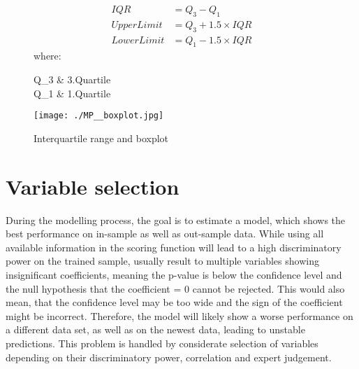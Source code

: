 \begin{figure}[H]
\begin{minipage}{.5\textwidth}
	\begin{align} 
	IQR &= Q_3 - Q_1 \label{eq:dp_iqr_boxpl1}\\
	Upper Limit &= Q_3 + 1.5 \times IQR \label{eq:dp_iqr_boxpl2}\\
	Lower Limit &= Q_1 - 1.5 \times IQR \label{eq:dp_iqr_boxpl3}
	\end{align}
	where:
	\begin{conditions}
	Q_{3}  		& 3.Quartile \\
	Q_{1}  		& 1.Quartile \\
	\end{conditions}
\end{minipage}%
\begin{minipage}{.5\textwidth}
	\centering
	\texttt{[image: ./MP\_\_boxplot.jpg]}
\end{minipage}
    \caption{Interquartile range and boxplot}
    \label{fig:dp_iqr_boxpl}
\end{figure}

\section{Variable selection}
During the modelling process, the goal is to estimate a model, which shows the best performance on in-sample as well as out-sample data. While using all available information in the scoring function will lead to a high discriminatory power on the trained sample, usually result to multiple variables showing insignificant coefficients, meaning the p-value is below the confidence level and the null hypothesis that the coefficient = 0 cannot be rejected. This would also mean, that the confidence level may be too wide and the sign of the coefficient might be incorrect. Therefore, the model will likely show a worse performance on a different data set, as well as on the newest data, leading to unstable predictions. This problem is handled by considerate selection of variables depending on their discriminatory power, correlation and expert judgement. 

